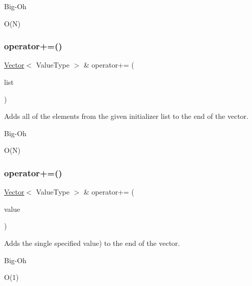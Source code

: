 \begin{DoxyRefDesc}{Big-\/\+Oh}
\item[\mbox{\hyperlink{BigOh__BigOh000141}{Big-\/\+Oh}}]O(\+N) \end{DoxyRefDesc}
\mbox{\label{classVector_a22e55ed53bfa2da64ecd22b36757fcea}} 
\subsubsection{\texorpdfstring{operator+=()}{operator+=()}\hspace{0.1cm}{\footnotesize\ttfamily [2/3]}}
{\footnotesize\ttfamily \mbox{\hyperlink{classVector}{Vector}}$<$ Value\+Type $>$ \& operator+= (\begin{DoxyParamCaption}\item[{std\+::initializer\+\_\+list$<$ Value\+Type $>$}]{list }\end{DoxyParamCaption})}



Adds all of the elements from the given initializer list to the end of the vector. 

\begin{DoxyRefDesc}{Big-\/\+Oh}
\item[\mbox{\hyperlink{BigOh__BigOh000142}{Big-\/\+Oh}}]O(\+N) \end{DoxyRefDesc}
\mbox{\label{classVector_afded71b2a6d6df8b0257cbfd8f7e8d5f}} 
\subsubsection{\texorpdfstring{operator+=()}{operator+=()}\hspace{0.1cm}{\footnotesize\ttfamily [3/3]}}
{\footnotesize\ttfamily \mbox{\hyperlink{classVector}{Vector}}$<$ Value\+Type $>$ \& operator+= (\begin{DoxyParamCaption}\item[{const Value\+Type \&}]{value }\end{DoxyParamCaption})}



Adds the single specified value) to the end of the vector. 

\begin{DoxyRefDesc}{Big-\/\+Oh}
\item[\mbox{\hyperlink{BigOh__BigOh000143}{Big-\/\+Oh}}]O(1) \end{DoxyRefDesc}
\mbox{\label{classVector_ad2a2f86bb5857209608bbbfe1066c650}} 
